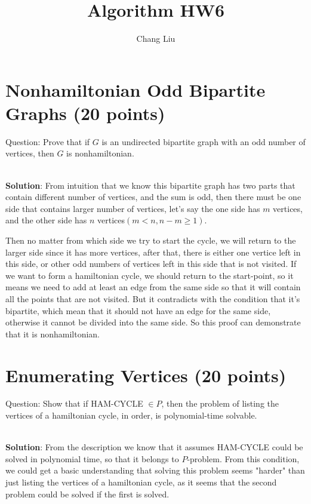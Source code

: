 \documentclass{article}
\author{Chang Liu}
\title{Algorithm HW6}
\begin{document}

\pagestyle{main}

\section{Nonhamiltonian Odd Bipartite Graphs (20 points)}
Question: Prove that if $G$ is an undirected bipartite graph with an odd number of vertices, then $G$ is nonhamiltonian.

~\\
\textbf{Solution}:\newline
From intuition that we know this bipartite graph has two parts that contain different number of vertices, and the sum is odd, then there must be one side that contains larger number of vertices, let's say the one side has $m$ vertices, and the other side has $n$ vertices$(m<n, n - m \geq 1)$.

Then no matter from which side we try to start the cycle, we will return to the larger side since it has more vertices, after that, there is either one vertice left in this side, or other odd numbers of vertices left in this side that is not visited. If we want to form a hamiltonian cycle, we should return to the start-point, so it means we need to add at least an edge from the same side so that it will contain all the points that are not visited. But it contradicts with the condition that it's bipartite, which mean that it should not have an edge for the same side, otherwise it cannot be divided into the same side. So this proof can demonstrate that it is nonhamiltonian.

\section{Enumerating Vertices (20 points)}
Question: Show that if HAM-CYCLE $\in{P}$, then the problem of listing the vertices of a hamiltonian cycle, in order, is polynomial-time solvable.

~\\
\textbf{Solution}:\newline
From the description we know that it assumes HAM-CYCLE could be solved in polynomial time, so that it belongs to $P$-problem. From this condition, we could get a basic understanding that solving this problem seems "harder" than just
listing the vertices of a hamiltonian cycle, as it seems that the second problem could be solved if the first is solved.
\end{document}
